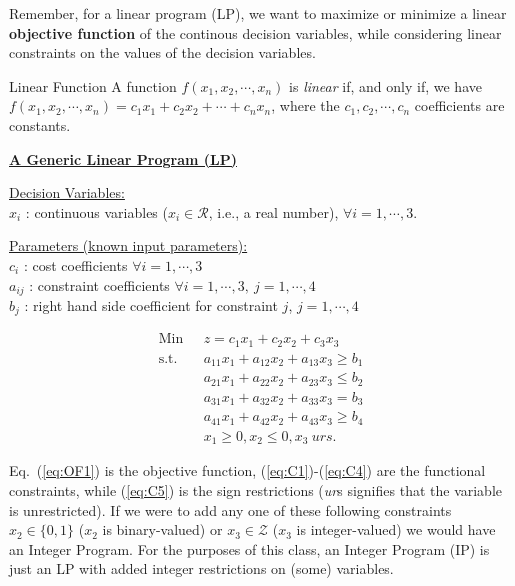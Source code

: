 %


Remember, for a linear program (LP), we want to maximize or minimize a linear {\bf objective function} of the continous decision variables, while considering linear constraints on the values of the decision variables.

\begin{definition}{Linear Function}
A function $f(x_1,x_2,\cdots,x_n)$ is \emph{linear} if, and only if, we have $f(x_1,x_2,\cdots,x_n) = c_1x_1 + c_2x_2 + \cdots + c_nx_n$, where the  $c_1,c_2,\cdots,c_n$ coefficients are constants.  
\end{definition}

\bigskip  \underline{\bf A Generic Linear Program (LP)}

\medskip  \underline{Decision Variables:}\\
$x_i$ : continuous variables ($x_i \in \mathcal{R}$, i.e., a real number), $\forall i = 1,\cdots,3$.

\medskip \underline{Parameters (known input parameters):}\\
$c_i$ : cost coefficients $\forall i = 1,\cdots,3$ \\
$a_{ij}$ : constraint coefficients $\forall i = 1,\cdots,3,~ j = 1,\cdots,4$ \\
$b_j$ : right hand side coefficient for constraint $j$, $j = 1,\cdots,4$

\begin{align}
\mbox{Min~~} & z = c_1x_1 + c_2x_2 + c_3x_3  \label{eq:OF1}\\
\mbox{s.t.~~} & a_{11}x_1 + a_{12}x_2 + a_{13} x_3 \ge b_1 \label{eq:C1} \\
& a_{21}x_1 + a_{22}x_2 + a_{23} x_3 \le b_2 \label{eq:C2} \\
& a_{31}x_1 + a_{32}x_2 + a_{33} x_3 = b_3 \label{eq:C3}\\
& a_{41}x_1 + a_{42}x_2 + a_{43} x_3 \ge b_4 \label{eq:C4}\\
& x_1 \ge 0, x_2 \le 0, x_3~urs \label{eq:C5}.
\end{align}

Eq.~(\ref{eq:OF1}) is the objective function, (\ref{eq:C1})-(\ref{eq:C4}) are the functional constraints, while (\ref{eq:C5}) is the sign restrictions ({\it ur}s signifies that the variable is unrestricted). If we were to add any one of these following constraints $x_2 \in \{0, 1\}$ ($x_2$ is binary-valued) or $x_3 \in \mathcal{Z}$ ($x_3$ is integer-valued) we would have an Integer Program.  For the purposes of this class, an Integer Program (IP) is just an LP with added integer restrictions on (some) variables.

